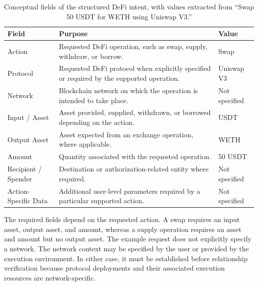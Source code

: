 \begin{table}[H]
\centering
\small
\caption{Conceptual fields of the structured DeFi intent, with values
extracted from ``Swap 50 USDT for WETH using Uniswap V3.''}
\label{tab:structured_intent_fields}

\begin{tabular}{@{}p{} p{} p{}@{}}
\hline
\textbf{Field} & \textbf{Purpose} & \textbf{Value} \\
\hline

Action &
Requested DeFi operation, such as swap, supply, withdraw, or borrow. &
Swap \\

Protocol &
Requested DeFi protocol when explicitly specified or required by the
supported operation. &
Uniswap V3 \\

Network &
Blockchain network on which the operation is intended to take place. &
Not specified \\

Input / Asset &
Asset provided, supplied, withdrawn, or borrowed depending on the action. &
USDT \\

Output Asset &
Asset expected from an exchange operation, where applicable. &
WETH \\

Amount &
Quantity associated with the requested operation. &
50 USDT \\

Recipient / Spender &
Destination or authorization-related entity where required. &
Not specified \\

Action-Specific Data &
Additional user-level parameters required by a particular supported action. &
Not specified \\

\hline
\end{tabular}
\end{table}

The required fields depend on the requested action. A swap requires an input
asset, output asset, and amount, whereas a supply operation requires an asset
and amount but no output asset. The example request does not explicitly
specify a network. The network context may be specified by the user or
provided by the execution environment. In either case, it must be established
before relationship verification because protocol deployments and their
associated execution resources are network-specific.

